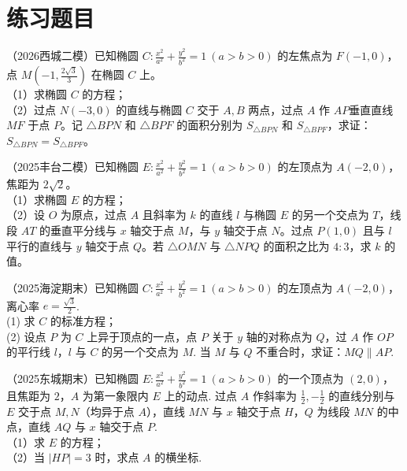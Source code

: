 \section{练习题目}

\begin{exercise} %
（2026西城二模）已知椭圆 $C:\frac{x^2}{a^2}+\frac{y^2}{b^2}=1\ (a>b>0)$ 的左焦点为 $F(-1,0)$，点 $M\left(-1,\frac{2\sqrt{3}}{3}\right)$ 在椭圆 $C$ 上。\\
（1）求椭圆 $C$ 的方程；\\
（2）过点 $N(-3,0)$ 的直线与椭圆 $C$ 交于 $A,B$ 两点，过点 $A$ 作 $AP$垂直直线$ MF$ 于点 $P$。记 $\triangle BPN$ 和 $\triangle BPF$ 的面积分别为 $S_{\triangle BPN}$ 和 $S_{\triangle BPF}$，求证：$S_{\triangle BPN}=S_{\triangle BPF}$。
\end{exercise}

\begin{exercise} %
（2025丰台二模）已知椭圆 $E:\frac{x^2}{a^2}+\frac{y^2}{b^2}=1\ (a>b>0)$ 的左顶点为 $A(-2,0)$，焦距为 $2\sqrt{2}$。\\
（1）求椭圆 $E$ 的方程；\\
（2）设 $O$ 为原点，过点 $A$ 且斜率为 $k$ 的直线 $l$ 与椭圆 $E$ 的另一个交点为 $T$，线段 $AT$ 的垂直平分线与 $x$ 轴交于点 $M$，与 $y$ 轴交于点 $N$。过点 $P(1,0)$ 且与 $l$ 平行的直线与 $y$ 轴交于点 $Q$。若 $\triangle OMN$ 与 $\triangle NPQ$ 的面积之比为 $4:3$，求 $k$ 的值。
\end{exercise}

\begin{exercise} %
（2025海淀期末）已知椭圆 $C:\frac{x^{2}}{a^{2}}+\frac{y^{2}}{b^{2}}=1\ (a>b>0)$ 的左顶点为 $A(-2,0)$，离心率 $e=\frac{\sqrt{3}}{2}$.\\
(1) 求 $C$ 的标准方程；\\
(2) 设点 $P$ 为 $C$ 上异于顶点的一点，点 $P$ 关于 $y$ 轴的对称点为 $Q$，过 $A$ 作 $OP$ 的平行线 $l$，$l$ 与 $C$ 的另一个交点为 $M$. 当 $M$ 与 $Q$ 不重合时，求证：$MQ\parallel AP$.

\end{exercise}

\begin{exercise} %
（2025东城期末）已知椭圆 $E:\frac{x^2}{a^2}+\frac{y^2}{b^2}=1\ (a>b>0)$ 的一个顶点为 $(2,0)$，且焦距为 $2$，$A$ 为第一象限内 $E$ 上的动点. 过点 $A$ 作斜率为 $\frac{1}{2},-\frac{1}{2}$ 的直线分别与 $E$ 交于点 $M,N$（均异于点 $A$），直线 $MN$ 与 $x$ 轴交于点 $H$，$Q$ 为线段 $MN$ 的中点，直线 $AQ$ 与 $x$ 轴交于点 $P$.\\
（1）求 $E$ 的方程；\\
（2）当 $\lvert HP\rvert=3$ 时，求点 $A$ 的横坐标.
\end{exercise}

